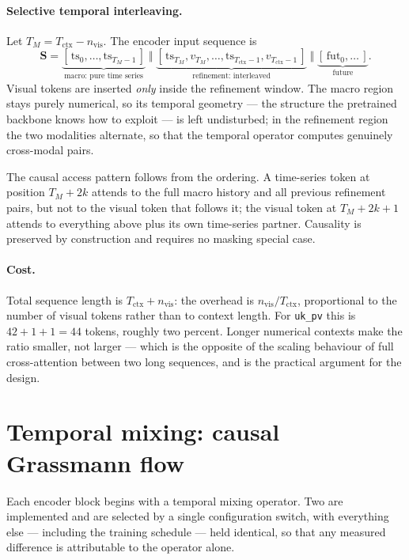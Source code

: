 \paragraph{Selective temporal interleaving.} Let $T_M = T_{\text{ctx}} - n_{\text{vis}}$. The
encoder input sequence is
\[
  \mathbf{S} =
  \underbrace{[\,\mathrm{ts}_0, \ldots, \mathrm{ts}_{T_M-1}\,]}_{\text{macro: pure time series}}
  \;\Vert\;
  \underbrace{[\,\mathrm{ts}_{T_M}, v_{T_M}, \ldots,
               \mathrm{ts}_{T_{\text{ctx}}-1}, v_{T_{\text{ctx}}-1}\,]}_{\text{refinement: interleaved}}
  \;\Vert\;
  \underbrace{[\,\mathrm{fut}_0, \ldots\,]}_{\text{future}} .
\]
Visual tokens are inserted \emph{only} inside the refinement window. The macro region stays
purely numerical, so its temporal geometry --- the structure the pretrained backbone knows
how to exploit --- is left undisturbed; in the refinement region the two modalities alternate,
so that the temporal operator computes genuinely cross-modal pairs.

The causal access pattern follows from the ordering. A time-series token at position
$T_M+2k$ attends to the full macro history and all previous refinement pairs, but not to the
visual token that follows it; the visual token at $T_M+2k+1$ attends to everything above plus
its own time-series partner. Causality is preserved by construction and requires no masking
special case.

\paragraph{Cost.} Total sequence length is $T_{\text{ctx}} + n_{\text{vis}}$: the overhead is
$n_{\text{vis}}/T_{\text{ctx}}$, proportional to the number of visual tokens rather than to
context length. For \texttt{uk\_pv} this is $42+1+1 = 44$ tokens, roughly two percent. Longer
numerical contexts make the ratio smaller, not larger --- which is the opposite of the scaling
behaviour of full cross-attention between two long sequences, and is the practical argument
for the design.

\section{Temporal mixing: causal Grassmann flow}
\label{sec:grassmann}

Each encoder block begins with a temporal mixing operator. Two are implemented and are
selected by a single configuration switch, with everything else --- including the training
schedule --- held identical, so that any measured difference is attributable to the operator
alone.

